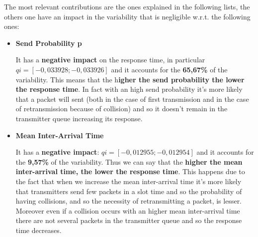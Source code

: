 \noindent The most relevant contributions are the ones explained in the following lists, the others one have an impact in the variability that is negligible w.r.t. the following ones: 

\begin{itemize}
	\item \textbf{Send Probability p}
	
	\noindent It has a \textbf{negative impact} on the response time, in particular $qi = [-0,033928; -0,033926]$ and it accounts for the \textbf{65,67\%} of the variability. This means that the h\textbf{igher the send probability the lower the response time}. In fact with an high send probability it's more likely that a packet will sent (both in the case of first transmission and in the case of retransmission because of collision) and so it doesn't remain in the transmitter queue increasing its response.  
	
	\item \textbf{Mean Inter-Arrival Time}
	
	\noindent It has a \textbf{negative impact}: $qi = [-0,012955; -0,012954]$ and it accounts for the \textbf{9,57\%} of the variability. Thus we can say that the \textbf{higher the mean inter-arrival time, the lower the response time}. This happens due to the fact that when we increase the mean inter-arrival time it's more likely that transmitters send few packets in a slot time and so the probability of having collisions, and so the necessity of retransmitting a packet, is lesser. Moreover even if a collision occurs with an higher mean inter-arrival time there are not several packets in the transmitter queue and so the response time decreases. 
\end{itemize}

\newpage
